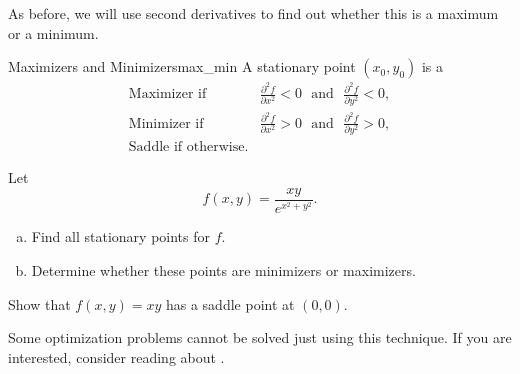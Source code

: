                         As before, we will use second derivatives to find out whether this is a maximum or a minimum.
                        
                        \begin{prop}{Maximizers and Minimizers}{max_min}
                        A stationary point $(x_0,y_0)$ is a 
                        \begin{align*}
                            \textrm{Maximizer if~ }& \frac{\partial^2 f}{\partial x^2} <0 \textrm{ ~and~ } \frac{\partial^2 f}{\partial y^2}<0,\\
                            \textrm{Minimizer if~ }& \frac{\partial^2 f}{\partial x^2} >0 \textrm{ ~and~ } \frac{\partial^2 f}{\partial y^2}>0,\\
                            \textrm{Saddle if otherwise.}
                        \end{align*}
                        \end{prop}
                        
                        \begin{exercise}
                        Let
                        \[
                        f(x,y) = \frac{xy}{e^{x^2+y^2}}.
                        \]
                        \begin{enumerate}[(a)]
                            \item Find all stationary points for $f$.
                            \item Determine whether these points are minimizers or maximizers.
                        \end{enumerate}
                        \end{exercise}
                        
                        \begin{exercise}
                        Show that $f(x,y)=xy$ has a saddle point at $(0,0)$.
                        \end{exercise}
                        
                        Some optimization problems cannot be solved just using this technique.  If you are interested, consider reading about .

